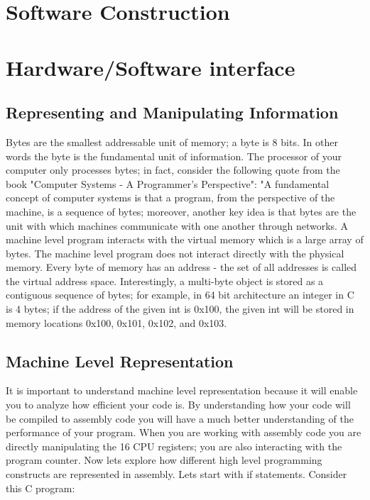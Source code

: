 \documentclass{amsbook}
\begin{document}
\chapter{Software Construction}

\chapter{Hardware/Software interface}

\section{Representing and Manipulating Information}

Bytes are the smallest addressable unit of memory; a byte is 8 bits. In other words the byte is the fundamental unit of information. The processor of your computer only processes bytes; in fact, consider the following quote from the book "Computer Systems - A Programmer's Perspective": "A fundamental concept of computer systems is that a program, from the perspective of the machine, is a sequence of bytes; moreover, another key idea is that bytes are the unit with which machines communicate with one another through networks. A machine level program interacts with the virtual memory which is a large array of bytes. The machine level program does not interact directly with the physical memory. Every byte of memory has an address - the set of all addresses is called the virtual address space. Interestingly, a multi-byte object is stored as a contiguous sequence of  bytes; for example, in 64 bit architecture an integer in C is 4 bytes; if the address of the given int is 0x100, the given int will be stored in memory locations 0x100, 0x101, 0x102, and 0x103.

\section{Machine Level Representation}

It is important to understand machine level representation because it will enable you to analyze how efficient your code is. By understanding how your code will be compiled to assembly code you will have a much better understanding of the performance of your program. When you are working with assembly code you are directly manipulating the 16 CPU registers; you are also interacting with the program counter. Now lets explore how different high level programming constructs are represented in assembly. Lets start with if statements. Consider this C program: 
\end{document}
